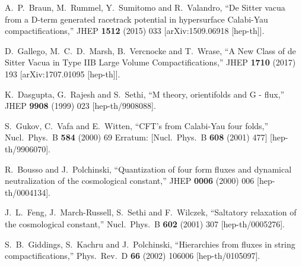 \documentclass[11pt,a4paper]{article}
\begin{document}
\begin{thebibliography}{99}
  A.~P.~Braun, M.~Rummel, Y.~Sumitomo and R.~Valandro,
  ``De Sitter vacua from a D-term generated racetrack potential in hypersurface Calabi-Yau compactifications,''
  JHEP {\bf 1512} (2015) 033
  [arXiv:1509.06918 [hep-th]].


  D.~Gallego, M.~C.~D.~Marsh, B.~Vercnocke and T.~Wrase,
  ``A New Class of de Sitter Vacua in Type IIB Large Volume Compactifications,''
  JHEP {\bf 1710} (2017) 193
  [arXiv:1707.01095 [hep-th]].


  K.~Dasgupta, G.~Rajesh and S.~Sethi,
  ``M theory, orientifolds and G - flux,''
  JHEP {\bf 9908} (1999) 023
  [hep-th/9908088].


  S.~Gukov, C.~Vafa and E.~Witten,
  ``CFT's from Calabi-Yau four folds,''
  Nucl.\ Phys.\ B {\bf 584} (2000) 69
   Erratum: [Nucl.\ Phys.\ B {\bf 608} (2001) 477]
  [hep-th/9906070].


  R.~Bousso and J.~Polchinski,
  ``Quantization of four form fluxes and dynamical neutralization of the cosmological constant,''
  JHEP {\bf 0006} (2000) 006
  [hep-th/0004134].


  J.~L.~Feng, J.~March-Russell, S.~Sethi and F.~Wilczek,
  ``Saltatory relaxation of the cosmological constant,''
  Nucl.\ Phys.\ B {\bf 602} (2001) 307
  [hep-th/0005276].


  S.~B.~Giddings, S.~Kachru and J.~Polchinski,
  ``Hierarchies from fluxes in string compactifications,''
  Phys.\ Rev.\ D {\bf 66} (2002) 106006
  [hep-th/0105097].



\end{thebibliography}
\end{document}
